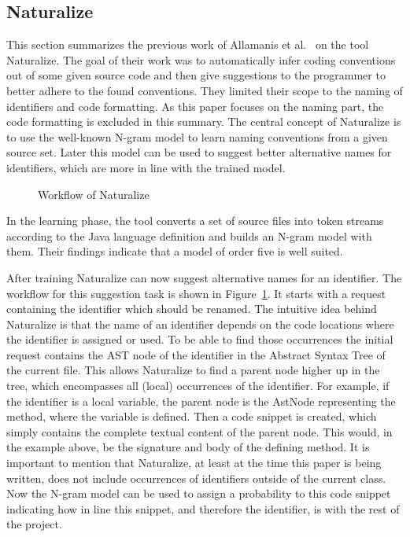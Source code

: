 \subsection{Naturalize}
This section summarizes the previous work of Allamanis et al.~\cite{naturalize} on the tool Naturalize.
The goal of their work was to automatically infer coding conventions out of some given source code
and then give suggestions to the programmer to better adhere to the found conventions.
They limited their scope to the naming of identifiers and code formatting. 
As this paper focuses on the naming part, the code formatting is excluded in this summary. 
The central concept of Naturalize is to use the well-known N-gram model to learn naming conventions from a given source set. Later this model can be used to suggest better alternative names for identifiers, which are more in line with the trained model. 
\begin{figure}
    \centering
    \graphicspath{{resources/}}  
    \def\svgwidth{0.5\textwidth}
    
    \caption{Workflow of Naturalize}
    \label{fig:back_nat_workflow}
\end{figure}

In the learning phase, the tool converts a set of source files into token streams according to the
Java language definition and builds an N-gram model with them. Their findings indicate that a model of
order five is well suited.

After training Naturalize can now suggest alternative names for an identifier. The workflow for this suggestion task is shown in Figure~\ref{fig:back_nat_workflow}.
It starts with a request containing the identifier which should be renamed.
The intuitive idea behind Naturalize is that the name of an identifier depends on the code locations where the identifier is assigned or used. To be able to find those occurrences the initial request contains the AST node of the identifier in the Abstract Syntax Tree
of the current file. This allows Naturalize to find a parent node higher up in the tree, which encompasses all (local) occurrences of the identifier. For example, if the identifier is a local variable, the parent node is the AstNode representing the method, where the variable is defined. Then a code snippet is created, which simply contains the complete textual content of the parent node. This would, in the example above, be the signature and body of the defining method. It is important to mention that Naturalize, at least at the time this paper is being written,
does not include occurrences of identifiers outside of the current class. Now the N-gram model can be used to assign a probability to this code snippet indicating how in line this snippet, and therefore the identifier, is with the rest of the project.

